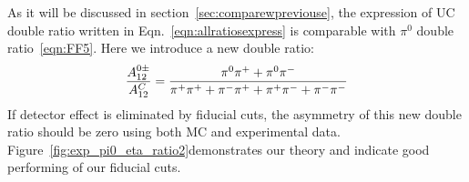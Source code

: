 As it will be discussed in section~\ref{sec:comparewpreviouse}, the expression of UC double ratio written in Eqn.~\ref{eqn:allratiosexpress} is comparable with $\pi^0$ double ratio~\ref{eqn:FF5}. Here we introduce a new double ratio:
\begin{equation}
\frac{A^{0\pm}_{12}}{A^C_{12}}=\frac{\pi^0\pi^++\pi^0\pi^-}{\pi^+\pi^++\pi^-\pi^++\pi^+\pi^-+\pi^-\pi^-}\\
\end{equation}
If detector effect is eliminated by fiducial cuts, the asymmetry of this new double ratio should be zero using both MC and experimental data. Figure~\ref{fig:exp_pi0_eta_ratio2}demonstrates our theory and indicate good performing of our fiducial cuts.
\begin{figure}[H]
  \centering     

\end{figure}
